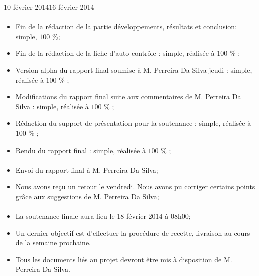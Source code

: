 \documentclass[12pt]{fiche-rd-info}
\begin{document}
\begin{fichesuivi}{10 février 2014}{16 février 2014}
\paragraph{}
	\begin{travaileffectue}
		\begin{itemize}
			\item  Fin de la rédaction de la partie développements, résultats et conclusion: simple, $100$ \%;
			\item Fin de la rédaction de la fiche d’auto-contrôle  : simple, réalisée à $100$ \% ;
			\item Version alpha du rapport final soumise à M. Perreira Da Silva jeudi :  simple, réalisée à $100$ \% ;
			\item Modifications du rapport final suite aux commentaires de   M. Perreira Da Silva : simple, réalisée à $100$ \% ;
			\item Rédaction du support de présentation pour la soutenance : simple, réalisée à $100$ \% ;
			\item Rendu du rapport final : simple, réalisée à $100$ \% ;
		\end{itemize}
	\end{travaileffectue}


\paragraph{}
	\begin{echange}
		\begin{itemize}
			\item Envoi du rapport final à M. Perreira Da Silva;
			\item Nous avons reçu un retour le vendredi. Nous avons pu corriger certains points grâce aux suggestions de M. Perreira Da Silva;
		\end{itemize}
	\end{echange}

\paragraph*{}
	\begin{planification}
		\begin{itemize}
			\item La soutenance finale aura lieu le 18 février 2014 à 08h00;
			\item Un dernier objectif est d’effectuer la procédure de recette, livraison au cours de la semaine prochaine.
			\item Tous les documents liés au projet devront être mis à disposition de M. Perreira Da Silva.
\end{itemize}
	\end{planification}
\end{fichesuivi}
\end{document}

